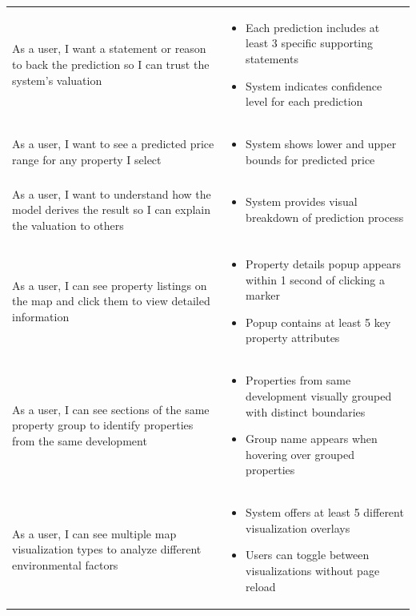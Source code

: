 \begin{longtable}{>{\raggedright\arraybackslash}p{}>{\raggedright\arraybackslash}p{}}
	As a user, I want a statement or reason to back the prediction so I can trust the system's valuation &
	\begin{itemize}
	\item Each prediction includes at least 3 specific supporting statements
	\item System indicates confidence level for each prediction
	\end{itemize} \\
	  
	\rowcolor[gray]{0.95}
	As a user, I want to see a predicted price range for any property I select &
	\begin{itemize}
	\item System shows lower and upper bounds for predicted price
	\end{itemize} \\
	  
	As a user, I want to understand how the model derives the result so I can explain the valuation to others &
	\begin{itemize}
	\item System provides visual breakdown of prediction process
	\end{itemize} \\
	
	\midrule
	\multicolumn{2}{l}{\textbf{Geospatial Visualization}} \\
	\midrule
	As a user, I can see property listings on the map and click them to view detailed information &
	\begin{itemize}
	\item Property details popup appears within 1 second of clicking a marker
	\item Popup contains at least 5 key property attributes
	\end{itemize} \\
	  
	\rowcolor[gray]{0.95}
	As a user, I can see sections of the same property group to identify properties from the same development &
	\begin{itemize}
	\item Properties from same development visually grouped with distinct boundaries
	\item Group name appears when hovering over grouped properties
	\end{itemize} \\
	  
	As a user, I can see multiple map visualization types to analyze different environmental factors &
	\begin{itemize}
	\item System offers at least 5 different visualization overlays
	\item Users can toggle between visualizations without page reload
	\end{itemize} \\
	  

\end{longtable}
